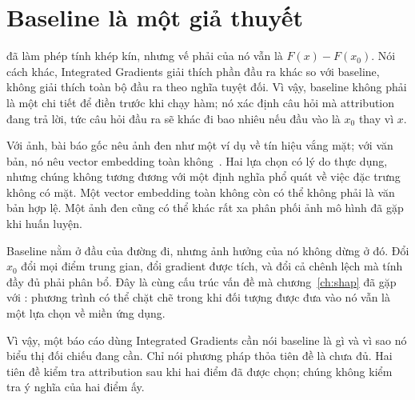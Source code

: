 \section{Baseline là một giả thuyết}
\label{sec:ch05-baseline}

%
 đã làm phép tính khép kín, nhưng vế phải của nó vẫn là
$F(x)-F(x_0)$. Nói cách khác, Integrated Gradients giải thích phần đầu ra khác
so với baseline, không giải thích toàn bộ đầu ra theo nghĩa tuyệt đối. Vì vậy,
baseline không phải là một chi tiết để điền trước khi chạy hàm;
nó xác định câu hỏi  mà attribution đang trả
lời, tức câu hỏi đầu ra sẽ khác đi bao nhiêu nếu đầu vào là $x_0$ thay vì $x$.

Với ảnh, bài báo gốc nêu ảnh đen như một ví dụ về tín hiệu vắng mặt; với văn
bản, nó nêu vector embedding toàn không~\autocite{p11ig}. Hai lựa chọn có lý
do thực dụng, nhưng chúng không tương đương với một định nghĩa phổ quát về
việc đặc trưng không có mặt. Một vector embedding toàn không còn có thể không
phải là văn bản hợp lệ. Một ảnh đen cũng có thể khác rất xa phân phối ảnh mô hình đã gặp khi
huấn luyện.

Baseline nằm ở đầu của đường đi, nhưng ảnh hưởng của nó không dừng ở đó. Đổi $x_0$ đổi mọi điểm
trung gian, đổi gradient được tích, và đổi cả chênh lệch mà tính đầy đủ phải
phân bổ. Đây là cùng cấu trúc vấn đề mà chương~\ref{ch:shap} đã gặp với
: phương trình có thể chặt chẽ
trong khi đối tượng được đưa vào nó vẫn là một lựa chọn về miền ứng dụng.

Vì vậy, một báo cáo dùng Integrated Gradients cần nói baseline là gì và vì sao
nó biểu thị đối chiếu đang cần. Chỉ nói phương pháp thỏa tiên đề là chưa đủ.
Hai tiên đề kiểm tra attribution sau khi hai điểm đã được chọn; chúng không
kiểm tra ý nghĩa của hai điểm ấy.

